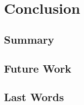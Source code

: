 \chapter*{Conclusion}
\label{chap:conclusion}

\section*{Summary}
\section*{Future Work}
\section*{Last Words}